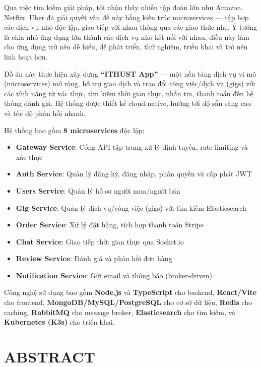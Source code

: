 \documentclass[12pt]{extreport}
\begin{document}
Qua việc tìm kiếm giải pháp, tôi nhận thấy nhiều tập đoàn lớn như Amazon, Netflix, Uber đã giải quyết vấn đề này bằng kiến trúc microservices --- tập hợp các dịch vụ nhỏ độc lập, giao tiếp với nhau thông qua các giao thức nhẹ. Ý tưởng là chia nhỏ ứng dụng lớn thành các dịch vụ nhỏ kết nối với nhau, điều này làm cho ứng dụng trở nên dễ hiểu, dễ phát triển, thử nghiệm, triển khai và trở nên linh hoạt hơn.

Đồ án này thực hiện xây dựng \textbf{``ITHUST App''} --- một nền tảng dịch vụ vi mô (microservices) mở rộng, hỗ trợ giao dịch và trao đổi công việc/dịch vụ (gigs) với các tính năng từ xác thực, tìm kiếm thời gian thực, nhắn tin, thanh toán đến hệ thống đánh giá. Hệ thống được thiết kế cloud-native, hướng tới độ sẵn sàng cao và tốc độ phản hồi nhanh.

Hệ thống bao gồm \textbf{8 microservices} độc lập:
\begin{itemize}
    \item \textbf{Gateway Service}: Cổng API tập trung xử lý định tuyến, rate limiting và xác thực
    \item \textbf{Auth Service}: Quản lý đăng ký, đăng nhập, phân quyền và cấp phát JWT
    \item \textbf{Users Service}: Quản lý hồ sơ người mua/người bán
    \item \textbf{Gig Service}: Quản lý dịch vụ/công việc (gigs) với tìm kiếm Elasticsearch
    \item \textbf{Order Service}: Xử lý đặt hàng, tích hợp thanh toán Stripe
    \item \textbf{Chat Service}: Giao tiếp thời gian thực qua Socket.io
    \item \textbf{Review Service}: Đánh giá và phản hồi đơn hàng
    \item \textbf{Notification Service}: Gửi email và thông báo (broker-driven)
\end{itemize}

Công nghệ sử dụng bao gồm \textbf{Node.js} và \textbf{TypeScript} cho backend, \textbf{React/Vite} cho frontend, \textbf{MongoDB/MySQL/PostgreSQL} cho cơ sở dữ liệu, \textbf{Redis} cho caching, \textbf{RabbitMQ} cho message broker, \textbf{Elasticsearch} cho tìm kiếm, và \textbf{Kubernetes (K3s)} cho triển khai.

\cleardoublepage

\chapter*{ABSTRACT}
\end{document}
